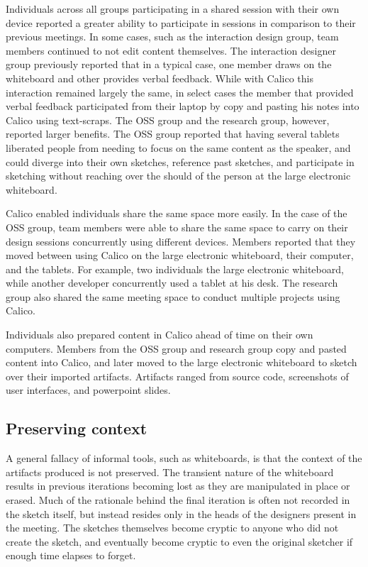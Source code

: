 Individuals across all groups participating in a shared session with their own device reported a greater ability to participate in sessions in comparison to their previous meetings. In some cases, such as the interaction design group, team members continued to not edit content themselves. The interaction designer group previously reported that in a typical case, one member draws on the whiteboard and other provides verbal feedback. While with Calico this interaction remained largely the same, in select cases the member that provided verbal feedback participated from their laptop by copy and pasting his notes into Calico using text-scraps. The OSS group and the research group, however, reported larger benefits. The OSS group reported that having several tablets liberated people from needing to focus on the same content as the speaker, and could diverge into their own sketches, reference past sketches, and participate in sketching without reaching over the should of the person at the large electronic whiteboard.

Calico enabled individuals share the same space more easily. In the case of the OSS group, team members were able to share the same space to carry on their design sessions concurrently using different devices. Members reported that they moved between using Calico on the large electronic whiteboard, their computer, and the tablets. For example, two individuals the large electronic whiteboard, while another developer concurrently used a tablet at his desk. The research group also shared the same meeting space to conduct multiple projects using Calico.

Individuals also prepared content in Calico ahead of time on their own computers. Members from the OSS group and research group copy and pasted content into Calico, and later moved to the large electronic whiteboard to sketch over their imported artifacts. Artifacts ranged from source code, screenshots of user interfaces, and powerpoint slides. 

\subsection{Preserving context}

A general fallacy of informal tools, such as whiteboards, is that the context of the artifacts produced is not preserved. The transient nature of the whiteboard results in previous iterations becoming lost as they are manipulated in place or erased. Much of the rationale behind the final iteration is often not recorded in the sketch itself, but instead resides only in the heads of the designers present in the meeting. The sketches themselves become cryptic to anyone who did not create the sketch, and eventually become cryptic to even the original sketcher if enough time elapses to forget.


